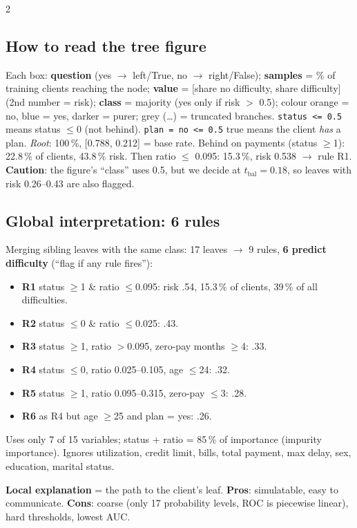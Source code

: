 \documentclass[a4paper,9pt]{extarticle}
\begin{document}
\begin{multicols}{2}
\subsection{How to read the tree figure}
Each box: \textbf{question} (yes $\to$ left/True, no $\to$ right/False); \textbf{samples} = \% of training
clients reaching the node; \textbf{value} = [share no difficulty, share difficulty] (2nd number = risk);
\textbf{class} = majority (yes only if risk $>$ 0.5); colour orange = no, blue = yes, darker = purer;
grey (\ldots) = truncated branches. \texttt{status <= 0.5} means status $\leq 0$ (not behind).
\texttt{plan = no <= 0.5} true means the client \emph{has} a plan.
\emph{Root}: 100\,\%, [0.788, 0.212] = base rate. Behind on payments (status $\geq$1): 22.8\,\% of clients,
43.8\,\% risk. Then ratio $\leq$ 0.095: 15.3\,\%, risk 0.538 $\to$ rule R1.
\textbf{Caution}: the figure's ``class'' uses 0.5, but we decide at $t_{\text{bal}}=0.18$, so leaves with risk
0.26--0.43 are also flagged.

\subsection{Global interpretation: 6 rules}
Merging sibling leaves with the same class: 17 leaves $\to$ 9 rules, \textbf{6 predict difficulty}
(``flag if any rule fires''):
\begin{itemize}
\item \textbf{R1} status $\geq$1 \& ratio $\leq$0.095: risk .54, 15.3\,\% of clients, 39\,\% of all difficulties.
\item \textbf{R2} status $\leq$0 \& ratio $\leq$0.025: .43.
\item \textbf{R3} status $\geq$1, ratio $>$0.095, zero-pay months $\geq$4: .33.
\item \textbf{R4} status $\leq$0, ratio 0.025--0.105, age $\leq$24: .32.
\item \textbf{R5} status $\geq$1, ratio 0.095--0.315, zero-pay $\leq$3: .28.
\item \textbf{R6} as R4 but age $\geq$25 and plan = yes: .26.
\end{itemize}
Uses only 7 of 15 variables; status + ratio = 85\,\% of importance (impurity importance). Ignores utilization,
credit limit, bills, total payment, max delay, sex, education, marital status.

\textbf{Local explanation} = the path to the client's leaf.
\textbf{Pros}: simulatable, easy to communicate. \textbf{Cons}: coarse (only 17 probability levels, ROC is
piecewise linear), hard thresholds, lowest AUC.


\end{multicols}
\end{document}
